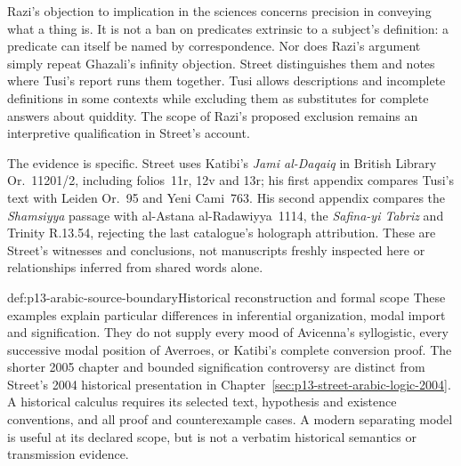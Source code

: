 Razi's objection to implication in the sciences concerns precision
in conveying what a thing is. It is not a ban on predicates
extrinsic to a subject's definition: a predicate can itself be
named by correspondence. Nor does Razi's argument simply
repeat Ghazali's infinity objection. Street distinguishes them
and notes where Tusi's report runs them together. Tusi allows
descriptions and incomplete definitions in some contexts while
excluding them as substitutes for complete answers about
quiddity. The scope of Razi's proposed exclusion remains an
interpretive qualification in Street's account.
\cite[pp.~119--123, 125]{Street2020PointersSignification}

The evidence is specific. Street uses Katibi's \emph{Jami
al-Daqaiq} in British Library Or.~11201/2, including folios~11r,
12v and 13r; his first appendix compares Tusi's text with
Leiden Or.~95 and Yeni Cami~763. His second appendix compares
the \emph{Shamsiyya} passage with al-Astana al-Radawiyya~1114,
the \emph{Safina-yi Tabriz} and Trinity R.13.54, rejecting the
last catalogue's holograph attribution. These are Street's
witnesses and conclusions, not manuscripts freshly inspected
here or relationships inferred from shared words alone.
\cite[pp.~102--103, 111--112, 118--121, 124--126, notes~12--13,
37, 61, 64, 73, 78 and 80]{Street2020PointersSignification}

\begin{proofboundary}{def:p13-arabic-source-boundary}{Historical reconstruction and formal scope}
These examples explain particular differences in inferential
organization, modal import and signification. They do not supply
every mood of Avicenna's syllogistic, every successive modal
position of Averroes, or Katibi's complete conversion proof.
The shorter 2005 chapter and bounded signification controversy are
distinct from Street's 2004 historical presentation in
Chapter~\ref{sec:p13-street-arabic-logic-2004}. A
historical calculus requires its selected text, hypothesis and
existence conventions, and all proof and counterexample cases.
A modern separating model is useful at its declared scope,
but is not a verbatim historical semantics or transmission evidence.
\end{proofboundary}
